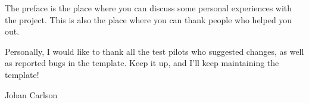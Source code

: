 The preface is the place where you can discuss some personal
experiences with the project. This is also the place where you can
thank people who helped you out.

Personally, I would like to thank all the test pilots who suggested
changes, as well as reported bugs in the template. Keep it up, and
I'll keep maintaining the template!

\vspace*{2cm}%
\hfill Johan Carlson
